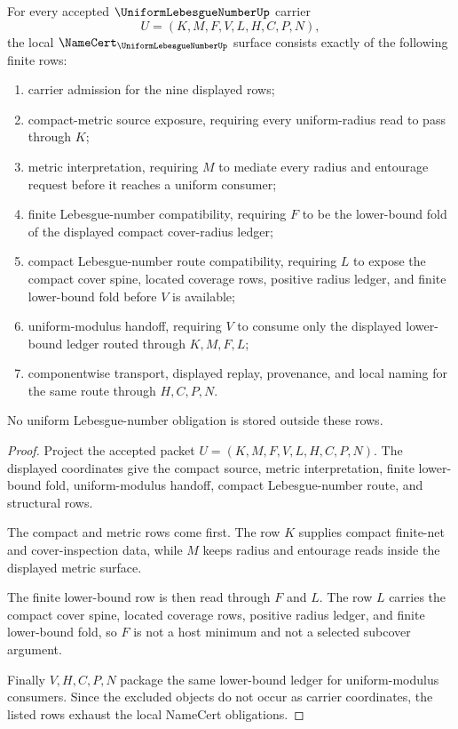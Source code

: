 \begin{theorem}
\label{thm:uniform-lebesgue-number-namecert-obligations}
For every accepted $\UniformLebesgueNumberUp$ carrier
$$
U=(K,M,F,V,L,H,C,P,N),
$$
the local $\NameCert_{\UniformLebesgueNumberUp}$ surface consists exactly of the following finite rows:
\begin{enumerate}
\item carrier admission for the nine displayed rows;
\item compact-metric source exposure, requiring every uniform-radius read to pass through $K$;
\item metric interpretation, requiring $M$ to mediate every radius and entourage request before it reaches a uniform consumer;
\item finite Lebesgue-number compatibility, requiring $F$ to be the lower-bound fold of the displayed compact cover-radius ledger;
\item compact Lebesgue-number route compatibility, requiring $L$ to expose the compact cover spine, located coverage rows, positive radius ledger, and finite lower-bound fold before $V$ is available;
\item uniform-modulus handoff, requiring $V$ to consume only the displayed lower-bound ledger routed through $K,M,F,L$;
\item componentwise transport, displayed replay, provenance, and local naming for the same route through $H,C,P,N$.
\end{enumerate}
No uniform Lebesgue-number obligation is stored outside these rows.
\end{theorem}
\begin{proof}
Project the accepted packet $U=(K,M,F,V,L,H,C,P,N)$. The displayed coordinates give the compact source, metric interpretation, finite lower-bound fold, uniform-modulus handoff, compact Lebesgue-number route, and structural rows.

The compact and metric rows come first. The row $K$ supplies compact finite-net and cover-inspection data, while $M$ keeps radius and entourage reads inside the displayed metric surface.

The finite lower-bound row is then read through $F$ and $L$. The row $L$ carries the compact cover spine, located coverage rows, positive radius ledger, and finite lower-bound fold, so $F$ is not a host minimum and not a selected subcover argument.

Finally $V,H,C,P,N$ package the same lower-bound ledger for uniform-modulus consumers. Since the excluded objects do not occur as carrier coordinates, the listed rows exhaust the local NameCert obligations.
\end{proof}

